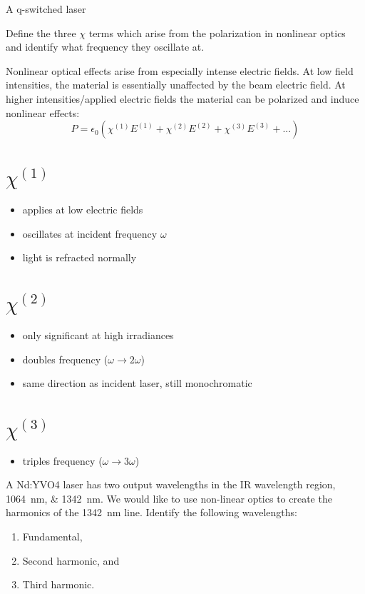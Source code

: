 \documentclass{hw}
\begin{document}
A q-switched laser 

\problem{}

Define the three $\chi$ terms which arise from the polarization in nonlinear optics and identify what frequency they oscillate at.

\solution

Nonlinear optical effects arise from especially intense electric fields. At low field intensities, the material is essentially unaffected by the beam electric field. At higher intensities/applied electric fields the material can be polarized and induce nonlinear effects:
$$
    P = \epsilon_0 \left( \chi^{(1)} E^{(1)} + \chi^{(2)} E^{(2)} + \chi^{(3)} E^{(3)} + ... \right)
$$

\part{$\chi^{\left(1\right)}$}

\begin{itemize}
    \item applies at low electric fields
    \item oscillates at incident frequency $\omega$
    \item light is refracted normally
\end{itemize}

\part{$\chi^{\left(2\right)}$}

\begin{itemize}
    \item only significant at high irradiances
    \item doubles frequency ($\omega \rightarrow 2\omega$)
    \item same direction as incident laser, still monochromatic
\end{itemize}

\part{$\chi^{\left(3\right)}$}

\begin{itemize}
    \item triples frequency ($\omega \rightarrow 3\omega$)
\end{itemize}

\problem{}

A Nd:YVO4 laser has two output wavelengths in the IR wavelength region, \SIlist{1064;1342}{\nano\meter}. We would like to use non-linear optics to create the harmonics of the \SI{1342}{\nano\meter} line. Identify the following wavelengths:
\begin{enumerate}
    \item Fundamental,
    \item Second harmonic, and
    \item Third harmonic.
\end{enumerate}
\end{document}
